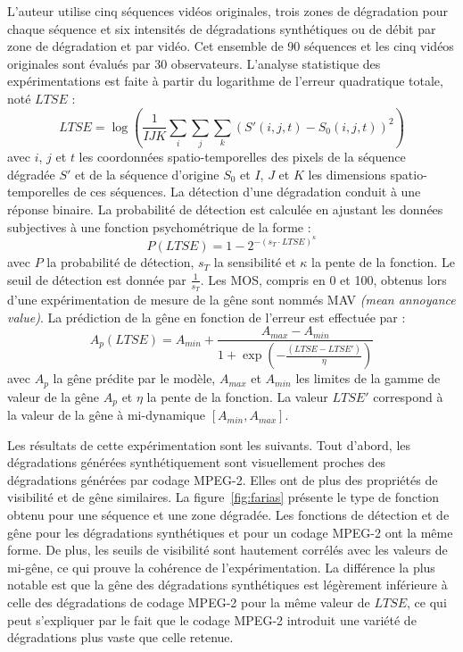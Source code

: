 L'auteur utilise cinq séquences vidéos originales, trois zones de dégradation pour chaque séquence et six intensités de dégradations synthétiques ou de débit par zone de dégradation et par vidéo. Cet ensemble de 90 séquences et les cinq vidéos originales sont évalués par 30 observateurs. L'analyse statistique des expérimentations est faite à partir du logarithme de l'erreur quadratique totale, noté $\mathit{LTSE}$ :
\begin{equation}
\mathit{LTSE} = \log\left( \frac{1}{IJK}\sum_i \sum_j\sum_k \left( S'(i,j,t) - S_0(i,j,t) \right)^2\right)
\end{equation}
%
avec $i$, $j$ et $t$ les coordonnées spatio-temporelles des pixels de la séquence dégradée $S'$ et de la séquence d'origine $S_0$ et $I$, $J$ et $K$ les dimensions spatio-temporelles de ces séquences. La détection d'une dégradation conduit à une réponse binaire. La probabilité de détection est calculée en ajustant les données subjectives à une fonction psychométrique de la forme :
\begin{equation}
P(\mathit{LTSE}) = 1 - 2^{-(s_T\cdot \mathit{LTSE})^\kappa}
\end{equation}
%
avec $P$ la probabilité de détection, $s_T$ la sensibilité et $\kappa$ la pente de la fonction. Le seuil de détection est donnée par $\frac{1}{s_T}$. Les MOS, compris en 0 et 100, obtenus lors d'une expérimentation de mesure de la gêne sont nommés MAV \emph{(mean annoyance value)}. La prédiction de la gêne en fonction de l'erreur est effectuée par :
\begin{equation}
A_p(\mathit{LTSE}) = A_{min} + \frac{A_{\textit{max}} - A_{\textit{min}}}{1+\exp\left(-\frac{(\mathit{LTSE}-\mathit{LTSE'})}{\eta}\right)}
\end{equation}
%
avec $A_p$ la gêne prédite par le modèle, $A_{\textit{max}}$ et $A_{\textit{min}}$ les limites de la gamme de valeur de la gêne $A_p$ et $\eta$ la pente de la fonction. La valeur $\mathit{LTSE'}$ correspond à la valeur de la gêne à mi-dynamique $[A_{\textit{min}},A_{\textit{max}}]$.

Les résultats de cette expérimentation sont les suivants. Tout d'abord, les dégradations générées synthétiquement sont visuellement proches des dégradations générées par codage MPEG-2. Elles ont de plus des propriétés de visibilité et de gêne similaires. La figure~\ref{fig:farias} présente le type de fonction obtenu pour une séquence et une zone dégradée. Les fonctions de détection et de gêne pour les dégradations synthétiques et pour un codage MPEG-2 ont la même forme. De plus, les seuils de visibilité sont hautement corrélés avec les valeurs de mi-gêne, ce qui prouve la cohérence de l'expérimentation. La différence la plus notable est que la gêne des dégradations synthétiques est légèrement inférieure à celle des dégradations de codage MPEG-2 pour la même valeur de $\mathit{LTSE}$, ce qui peut s'expliquer par le fait que le codage MPEG-2 introduit une variété de dégradations plus vaste que celle retenue.

